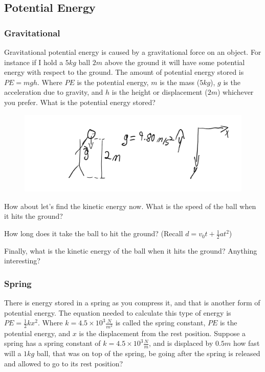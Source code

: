 \documentclass[12pt]{article}
\begin{document}
\subsection{Potential Energy}
\subsubsection{Gravitational}
Gravitational potential energy is caused by a gravitational force on an object. For instance if I hold a $5 kg$ ball $2 m$ above the ground it will have some potential energy with respect to the ground. The amount of potential energy stored is $PE = mgh$. Where $PE$ is the potential energy, $m$ is the mass ($5 kg$), $g$ is the acceleration due to gravity, and $h$ is the height or displacement ($2m$) whichever you prefer. What is the potential energy stored?

\begin{figure}[h]
\includegraphics[scale=0.2]{energy_gravity.png}
\end{figure}

\parbox[][6cm][t]{8cm}{}

How about let's find the kinetic energy now. What is the speed of the ball when it hits the ground?

\parbox[][6cm][t]{8cm}{}

How long does it take the ball to hit the ground? (Recall $d=v_0t + \frac{1}{2}at^2$)

\parbox[][6cm][t]{8cm}{}

Finally, what is the kinetic energy of the ball when it hits the ground? Anything interesting?

\parbox[][10cm][t]{8cm}{}

\subsubsection{Spring}
There is energy stored in a spring as you compress it, and that is another form of potential energy. The equation needed to calculate this type of energy is $PE = \frac{1}{2}kx^{2}$. Where $k = 4.5 \times 10^3 \frac{N}{m^2}$ is called the spring constant, $PE$ is the potential energy, and $x$ is the displacement from the rest position. Suppose a spring has a spring constant of $k = 4.5 \times 10^3 \frac{N}{m}$, and is displaced by $0.5 m$ how fast will a $1kg$ ball, that was on top of the spring, be going after the spring is released and allowed to go to its rest position?
\end{document}
